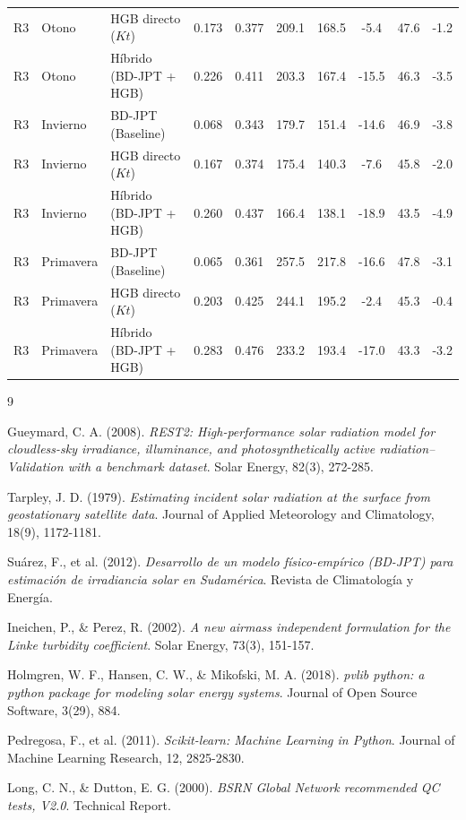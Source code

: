 \documentclass[../main.tex]{subfiles}
\begin{document}
\begin{table}[!ht]
{\begin{tabular}{l l l c c c c c c c}
R3 & Otono & HGB directo ($Kt$) & 0.173 & 0.377 & 209.1 & 168.5 & -5.4 & 47.6 & -1.2 \\
R3 & Otono & Híbrido (BD-JPT + HGB) & 0.226 & 0.411 & 203.3 & 167.4 & -15.5 & 46.3 & -3.5 \\
R3 & Invierno & BD-JPT (Baseline) & 0.068 & 0.343 & 179.7 & 151.4 & -14.6 & 46.9 & -3.8 \\
R3 & Invierno & HGB directo ($Kt$) & 0.167 & 0.374 & 175.4 & 140.3 & -7.6 & 45.8 & -2.0 \\
R3 & Invierno & Híbrido (BD-JPT + HGB) & 0.260 & 0.437 & 166.4 & 138.1 & -18.9 & 43.5 & -4.9 \\
R3 & Primavera & BD-JPT (Baseline) & 0.065 & 0.361 & 257.5 & 217.8 & -16.6 & 47.8 & -3.1 \\
R3 & Primavera & HGB directo ($Kt$) & 0.203 & 0.425 & 244.1 & 195.2 & -2.4 & 45.3 & -0.4 \\
R3 & Primavera & Híbrido (BD-JPT + HGB) & 0.283 & 0.476 & 233.2 & 193.4 & -17.0 & 43.3 & -3.2 \\
\bottomrule
\end{tabular}
}
\end{table}


\newpage
\begin{thebibliography}{9}

Gueymard, C. A. (2008). 
\textit{REST2: High-performance solar radiation model for cloudless-sky irradiance, illuminance, and photosynthetically active radiation--Validation with a benchmark dataset}. 
Solar Energy, 82(3), 272-285.

Tarpley, J. D. (1979). 
\textit{Estimating incident solar radiation at the surface from geostationary satellite data}. 
Journal of Applied Meteorology and Climatology, 18(9), 1172-1181.

Suárez, F., et al. (2012). 
\textit{Desarrollo de un modelo físico-empírico (BD-JPT) para estimación de irradiancia solar en Sudamérica}. 
Revista de Climatología y Energía.

Ineichen, P., \& Perez, R. (2002). 
\textit{A new airmass independent formulation for the Linke turbidity coefficient}. 
Solar Energy, 73(3), 151-157.

Holmgren, W. F., Hansen, C. W., \& Mikofski, M. A. (2018). 
\textit{pvlib python: a python package for modeling solar energy systems}. 
Journal of Open Source Software, 3(29), 884.

Pedregosa, F., et al. (2011). 
\textit{Scikit-learn: Machine Learning in Python}. 
Journal of Machine Learning Research, 12, 2825-2830.

Long, C. N., \& Dutton, E. G. (2000). 
\textit{BSRN Global Network recommended QC tests, V2.0}. 
Technical Report.

\end{thebibliography}
\end{document}
